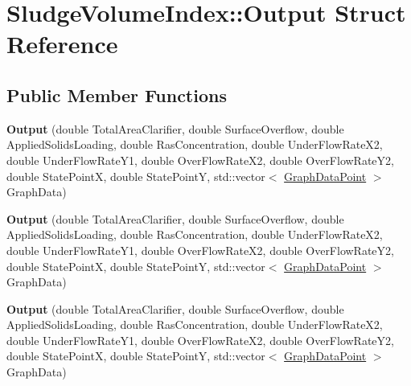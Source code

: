 \hypertarget{struct_sludge_volume_index_1_1_output}{}\section{Sludge\+Volume\+Index\+:\+:Output Struct Reference}
\label{struct_sludge_volume_index_1_1_output}
\subsection*{Public Member Functions}
\begin{DoxyCompactItemize}
\item 
\mbox{\label{struct_sludge_volume_index_1_1_output_a4119dd045b5aa5d9a8ff451b3be8f642}} 
{\bfseries Output} (double Total\+Area\+Clarifier, double Surface\+Overflow, double Applied\+Solids\+Loading, double Ras\+Concentration, double Under\+Flow\+Rate\+X2, double Under\+Flow\+Rate\+Y1, double Over\+Flow\+Rate\+X2, double Over\+Flow\+Rate\+Y2, double State\+PointX, double State\+PointY, std\+::vector$<$ \hyperlink{struct_sludge_volume_index_1_1_graph_data_point}{Graph\+Data\+Point} $>$ Graph\+Data)
\item 
\mbox{\label{struct_sludge_volume_index_1_1_output_a4119dd045b5aa5d9a8ff451b3be8f642}} 
{\bfseries Output} (double Total\+Area\+Clarifier, double Surface\+Overflow, double Applied\+Solids\+Loading, double Ras\+Concentration, double Under\+Flow\+Rate\+X2, double Under\+Flow\+Rate\+Y1, double Over\+Flow\+Rate\+X2, double Over\+Flow\+Rate\+Y2, double State\+PointX, double State\+PointY, std\+::vector$<$ \hyperlink{struct_sludge_volume_index_1_1_graph_data_point}{Graph\+Data\+Point} $>$ Graph\+Data)
\item 
\mbox{\label{struct_sludge_volume_index_1_1_output_a4119dd045b5aa5d9a8ff451b3be8f642}} 
{\bfseries Output} (double Total\+Area\+Clarifier, double Surface\+Overflow, double Applied\+Solids\+Loading, double Ras\+Concentration, double Under\+Flow\+Rate\+X2, double Under\+Flow\+Rate\+Y1, double Over\+Flow\+Rate\+X2, double Over\+Flow\+Rate\+Y2, double State\+PointX, double State\+PointY, std\+::vector$<$ \hyperlink{struct_sludge_volume_index_1_1_graph_data_point}{Graph\+Data\+Point} $>$ Graph\+Data)
\end{DoxyCompactItemize}
